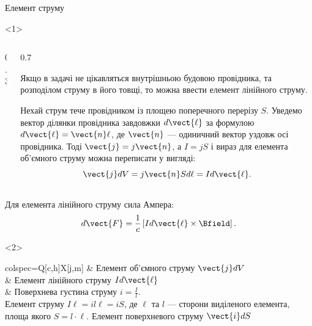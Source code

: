 \documentclass{beamer}
\begin{document}
\begin{frame}{Елемент струму}{}
	\begin{onlyenv}
		\begin{columns}
			\begin{column}{0.3\linewidth}\centering
				
			\end{column}
			\begin{column}{0.7\linewidth}
				\begin{block}{}\justifying
					Якщо в задачі не цікавляться внутрішньою будовою провідника, та
					розподілом струму в його товщі, то можна ввести \alert{елемент
						лінійного струму}.
				\end{block}
				\begin{block}{}\justifying
					Нехай струм тече провідником із площею поперечного перерізу $S$.
					Уведемо вектор ділянки провідника завдовжки $d\vect{\ell}$ за формулою
					$d\vect{\ell} = \vect{n}\ell$, де $\vect{n}$ --- одиничний вектор
					уздовж осі провідника. Тоді $\vect{j} = j\vect{n}$, а $I = j S$ і
					вираз для елемента об'ємного струму можна переписати у вигляді:
					\begin{equation*}
						\vect{j}dV = j\vect{n} S d\ell  = I d\vect{\ell}.
					\end{equation*}
				\end{block}
			\end{column}
		\end{columns}
		\begin{block}{}
			Для елемента лінійного струму сила Ампера:
			\begin{equation*}
				d\vect{F} = \frac1c \left[ I d\vect{\ell} \times \Bfield\right].
			\end{equation*}
		\end{block}
	\end{onlyenv}
	\begin{onlyenv}
		\begin{tblr}{colspec={Q[c,h]X[j,m]}}
			 & Елемент об'ємного струму $\vect{j}dV$ \\
			 & Елемент лінійного струму $Id\vect{\ell}$ \\
			
				& { Поверхнева густина струму $i = \frac{I}{l}$. \\ Елемент струму $I\ell = il\ell = i S$, де $\ell$ та $l$ --- сторони виділеного елемента, площа якого $S = l\cdot \ell$. Елемент поверхневого струму $\vect{i}dS$ }
		\end{tblr}
	\end{onlyenv}
\end{frame}
\end{document}
